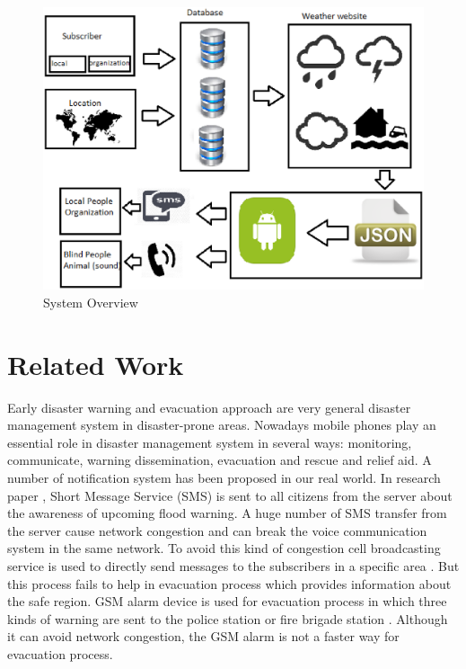 \documentclass[conference]{IEEEtran}
\begin{document}
  
\begin{figure}[htp]
	\centering
		\includegraphics[width=.95\textwidth]{fig/architecture.eps}
	\caption{ System Overview }
	\label{Figure:overview}
\end{figure}


\section {Related Work}
\label {relatedworks}

Early disaster warning and evacuation approach are very general disaster management system in disaster-prone areas. Nowadays mobile phones play an essential role in disaster management system in several ways: monitoring, communicate, warning dissemination, evacuation and rescue and relief aid. A number of notification system has been proposed in our real world. In research paper \cite{cioca2008sms, jeong2009national}, Short Message Service (SMS) is sent to all citizens from the server about the awareness of upcoming flood warning. A huge number of SMS transfer from the server cause network congestion and can break the voice communication system in the same network. To avoid this kind of congestion cell broadcasting service is used to directly send messages to the subscribers in a specific area \cite {scherner2005notifying}. But this process fails to help in evacuation process which provides information about the safe region. GSM alarm device is used for evacuation process in which three kinds of warning are sent to the police station or fire brigade station \cite{jayasinghe2006gsm}. Although it can avoid network congestion, the GSM alarm is not a faster way for evacuation process.  
 
\end{document}
